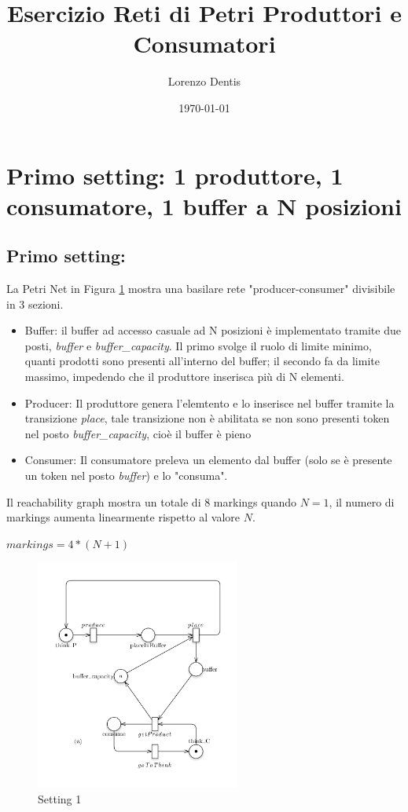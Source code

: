 \documentclass{article}
\begin{document}
\title{Esercizio Reti di Petri Produttori e Consumatori}
\author{Lorenzo Dentis}

\date{\today}

\maketitle

\section{Primo setting: 1 produttore, 1 consumatore, 1 buffer a N posizioni}\label{SEC:primo}
\subsection{Primo setting:}
La Petri Net in Figura \ref{FIG:setting1} mostra una basilare rete "producer-consumer" divisibile in 3 sezioni.
\begin{itemize}
	\item Buffer: il buffer ad accesso casuale ad N posizioni è implementato tramite due posti, \emph{buffer} e \emph{buffer\_capacity}.
		Il primo svolge il ruolo di limite minimo, quanti prodotti sono presenti all'interno del buffer; il secondo fa da limite massimo, impedendo che il produttore inserisca più di N elementi.
	\item Producer: Il produttore genera l'elemtento e lo inserisce nel buffer tramite la transizione \emph{place}, tale transizione non è abilitata se non sono presenti token nel posto \emph{buffer\_capacity}, cioè il buffer è pieno
	\item Consumer: Il consumatore preleva un elemento dal buffer (solo se è presente un token nel posto \emph{buffer}) e lo "consuma".
\end{itemize}
Il reachability graph mostra un totale di 8 markings quando $N =1$, il numero di markings aumenta linearmente rispetto al valore $N$.\begin{center}$markings = 4*(N + 1)$\end{center}
\begin{figure}[!ht]
\centering
\includegraphics[width=0.6\textwidth]{./Esercizio2_img/setting1.png}
\caption{Setting 1} \label{FIG:setting1}
\end{figure}
\newpage
\end{document}
